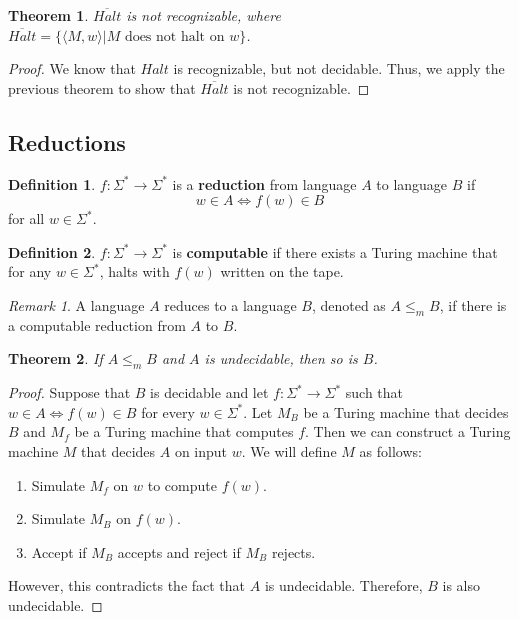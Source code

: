 \documentclass[11pt]{article}
\theoremstyle{plain} %
\newtheorem*{theorem}{Theorem}
\theoremstyle{definition}
\newtheorem*{definition}{Definition} %
\theoremstyle{example}
\theoremstyle{remark}
\newtheorem*{remark}{Remark}
\begin{document}
\begin{theorem}
$\overline{Halt}$ is not recognizable, where $\overline{Halt} = \{ \langle M, w \rangle | M \text{ does not halt on } w \} $.
\end{theorem}

\begin{proof}
We know that $Halt$ is recognizable, but not decidable. Thus, we apply the previous theorem to show that $\overline{Halt}$ is not recognizable. 
\end{proof}




\subsection{Reductions}

\begin{definition}
$f: \Sigma^* \rightarrow \Sigma^*$ is a \textbf{reduction} from language $A$ to language $B$ if 
$$w \in A \iff f(w) \in B$$
for all $w \in \Sigma^*$.
\end{definition}

\begin{definition}
$f: \Sigma^* \rightarrow \Sigma^*$ is \textbf{computable} if there exists a Turing machine that for any $w\in \Sigma^*$, halts with $f(w)$ written on the tape. 
\end{definition}



\begin{remark}
A language $A$ reduces to a language $B$, denoted as $ A \leq_m B$, if there is a computable reduction from $A$ to $B$.
\end{remark}

\begin{theorem}
If $A \leq_m B$ and $A$ is undecidable, then so is $B$.
\end{theorem}

\begin{proof}
Suppose that $B$ is decidable and let $f : \Sigma^* \rightarrow \Sigma^*$ such that $w \in A \iff f(w) \in B$ for every $w \in \Sigma^*$. Let $M_B$ be a Turing machine that decides $B$ and $M_f$ be a Turing machine that computes $f$. Then we can construct a Turing machine $M$ that decides $A$ on input $w$. We will define $M$ as follows:

\begin{enumerate}
	\item Simulate $M_f$ on $w$ to compute $f(w)$.
	\item Simulate $M_B$ on $f(w)$. 
	\item Accept if $M_B$ accepts and reject if $M_B$ rejects. 
\end{enumerate}

However, this contradicts the fact that $A$ is undecidable. Therefore, $B$ is also undecidable. 
\end{proof}
\end{document}
